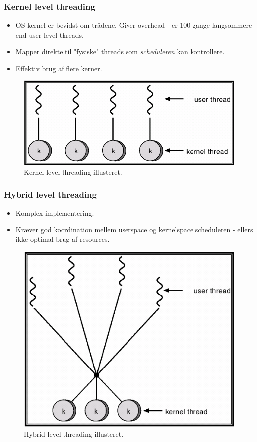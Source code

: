 \subsubsection{Kernel level threading}
\begin{itemize}
	\item OS kernel er bevidst om trådene. Giver overhead - er 100 gange langsommere end user level threads.
	\item Mapper direkte til "fysiske" threads som \textit{scheduleren} kan kontrollere.
	\item Effektiv brug af flere kerner.
\end{itemize}

\begin{figure}[H]
	\centering
	\includegraphics[width=0.5\linewidth]{figs/kernelthreads}
	\caption{Kernel level threading illusteret.}
	\label{fig:kernelthreads}
\end{figure}

\subsubsection{Hybrid level threading}
\begin{itemize}
	\item Komplex implementering.
	\item Kræver god koordination mellem userspace og kernelspace scheduleren - ellers ikke optimal brug af resources.
\end{itemize}

\begin{figure}[H]
	\centering
	\includegraphics[width=0.5\linewidth]{figs/hybridthreads}
	\caption{Hybrid level threading illusteret.}
	\label{fig:hybridthreads}
\end{figure}

